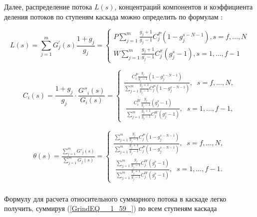 Далее, распределение потока $L(s)$, концентраций компонентов и коэффициента деления потоков по ступеням каскада можно определить по формулам \cite{sulaberidzeTeoriyaKaskadovDlya2011}:

\begin{equation} \label{GrindEQ__1_59_} 
L(s)=\sum_{j=1}^{m} G_{j}^{\prime}(s) \frac{1+g_{j}}{g_{j}}=\left\{\begin{array}{c}
  P \sum_{j=1}^{m} \frac{g_{j}+1}{g_{j}-1} C_{j}^{P}\left(1-g_{j}^{s-N-1}\right), s=f, \ldots, N \\
  W \sum_{j=1}^{m} \frac{g_{j}+1}{g_{j}-1} C_{j}^{\pi}\left(g_{j}^{s}-1\right), s=1, \ldots, f-1
  \end{array}\right.
\end{equation} 

\begin{equation} \label{GrindEQ__1_60_} 
C_{i} (s)=\frac{1+g_{j} }{g_{j} } \cdot \frac{G''_{i} (s)}{G_{i} (s)} =\left\{\begin{array}{l} {\frac{C_{i}^{P} \frac{g_{j} }{g_{j} -1} \left(1-g_{j}^{s-N-1} \right)}{\sum _{j=1}^{m}\frac{g_{j} +1}{g_{j} -1}  C_{j}^{P} \left(1-g_{j}^{s-N-1} \right)} ,\; \; s=f,...,N,} \\ {\; \frac{C_{i}^{W} \frac{g_{j} }{g_{j} -1} \left(g_{j}^{s} -1\right)}{\sum _{j=1}^{m}\frac{g_{j} +1}{g_{j} -1}  C_{j}^{W} \left(g_{j}^{s} -1\right)} ,\; \; s=1,...,f-1,} \end{array}\right.  
\end{equation} 

\begin{equation} \label{GrindEQ__1_61_} 
\begin{array}{l} {\theta (s)=\frac{\sum _{j=1}^{m}G'_{j} (s) }{\sum _{j=1}^{m}G_{j} (s) } =\left\{\begin{array}{l} {\frac{\sum _{j=1}^{m}\frac{g_{j} }{g_{j} -1} C_{j}^{P} \left(1-g_{j}^{s-N-1} \right) }{\sum _{j=1}^{m}\frac{g_{j} +1}{g_{j} -1}  C_{j}^{P} \left(1-g_{j}^{s-N-1} \right)} ,\; \; s=f,...,N,} \\ {\; \frac{\sum _{j=1}^{m}\frac{g_{j} }{g_{j} -1} C_{j}^{W} \left(g_{j}^{s} -1\right) }{\sum _{j=1}^{m}\frac{g_{j} +1}{g_{j} -1}  C_{j}^{W} \left(g_{j}^{s} -1\right)} ,\; \; s=1,...,f-1.} \end{array}\right. } \\ {\; } \end{array} 
\end{equation}

Формулу для расчета относительного суммарного потока в каскаде легко получить, суммируя (\ref{GrindEQ__1_59_}) по всем ступеням каскада

